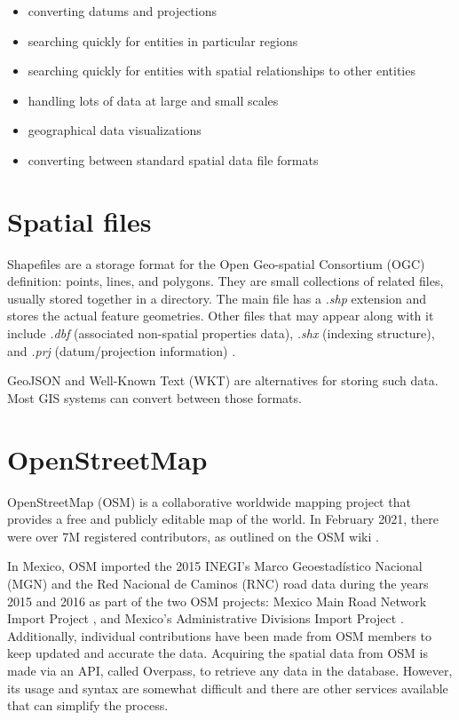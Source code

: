 \begin{itemize}
	\item converting datums and projections
	\item searching quickly for entities in particular regions
	\item searching quickly for entities with spatial relationships to other entities
	\item handling lots of data at large and small scales
	\item geographical data visualizations
	\item converting between standard spatial data file formats
\end{itemize}

\section{Spatial files}

Shapefiles are a storage format for the Open Geo-spatial Consortium (OGC) definition: points, lines, and polygons. They are small collections of related files, usually stored together in a directory. The main file has a \textit{.shp} extension and stores the actual feature geometries. Other files that may appear along with it include \textit{.dbf} (associated non-spatial properties data), \textit{.shx} (indexing structure), and \textit{.prj} (datum/projection information) \cite{fox_spatial_2018}.

GeoJSON and Well-Known Text (WKT) are alternatives for storing such data. Most GIS systems can convert between those formats.

\section{OpenStreetMap}

OpenStreetMap (OSM) is a collaborative worldwide mapping project that provides a free and publicly editable map of the world. In February 2021, there were over 7M registered contributors, as outlined on the OSM wiki \cite{osm-wiki}.

In Mexico, OSM imported the 2015 INEGI's Marco Geoestadístico Nacional (MGN) and the Red Nacional de Caminos (RNC) road data during the years 2015 and 2016 as part of the two OSM projects: Mexico Main Road Network Import Project \cite{osm_RNC_project}, and Mexico's Administrative Divisions Import Project \cite{osm_MGN_project}. Additionally, individual contributions have been made from OSM members to keep updated and accurate the data.
Acquiring the spatial data from OSM is made via an API, called Overpass, to retrieve any data in the database. However, its usage and syntax are somewhat difficult and there are other services available that can simplify the process.

